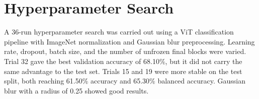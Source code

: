 \begin{table}[H]
\centering
{}
\caption{Direct multiclass classification results}
\label{tab:direct_multiclass}
\end{table}

\begin{table}[H]
\centering
\scriptsize
{}
\caption{Equalized dataset multiclass confusion matrix}
\label{tab:equalized_cm}
\end{table}

\begin{table}[H]
\centering
\scriptsize
{}
\caption{ResNet18 direct four-class confusion matrix}
\label{tab:resnet_direct_cm}
\end{table}

\section{Hyperparameter Search}
A 36-run hyperparameter search was carried out using a ViT classification pipeline with ImageNet normalization and Gaussian blur preprocessing. Learning rate, dropout, batch size, and the number of unfrozen final blocks were varied. Trial 32 gave the best validation accuracy of 68.10\%, but it did not carry the same advantage to the test set. Trials 15 and 19 were more stable on the test split, both reaching 61.50\% accuracy and 65.30\% balanced accuracy. Gaussian blur with a radius of 0.25 showed good results.



